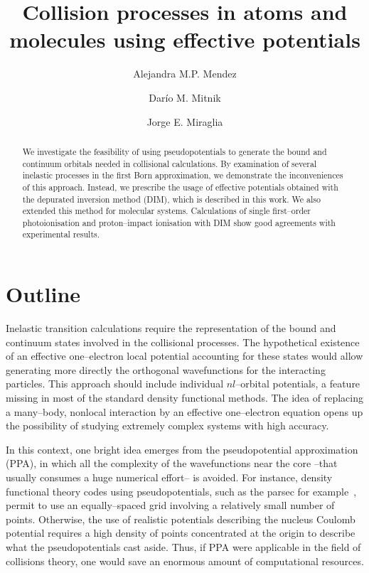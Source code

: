 \documentclass[10pt]{article}
\begin{document}
\title{Collision processes in atoms and molecules using effective 
potentials}
\author[ ]{Alejandra M.P. Mendez}
\author[ ]{Dar\'io M. Mitnik}
\author[ ]{Jorge E. Miraglia}

\maketitle

\tableofcontents

\begin{abstract}
We investigate the feasibility of using pseudopotentials to generate
the bound and continuum orbitals needed in collisional calculations. 
By examination of several inelastic processes in the first Born 
approximation, we demonstrate the inconveniences of this approach. 
Instead, we prescribe the usage of effective potentials obtained with 
the depurated inversion method (DIM), which is described in this work. 
We also extended this method for molecular systems. Calculations of 
single first--order photoionisation and proton--impact ionisation with 
DIM show good agreements with experimental results.
\end{abstract}


\section{Outline}

Inelastic transition calculations require the representation of 
the bound and continuum states involved in the collisional processes. 
The hypothetical existence of an effective one--electron local 
potential accounting for these states would allow generating more 
directly the orthogonal wavefunctions for the interacting particles.
This approach should include individual $nl$--orbital potentials, a 
feature missing in most of the standard density functional methods. 
The idea of replacing a many--body, nonlocal interaction by an 
effective one--electron equation opens up the possibility of studying
extremely complex systems with high accuracy. 

In this context, one bright idea emerges from the pseudopotential
approximation (PPA), in which all the complexity of the wavefunctions near 
the core --that usually consumes a huge numerical effort-- is avoided.
For instance, density functional theory codes using pseudopotentials, 
such as the {\sc parsec} for example~\cite{parsecwebpage,Chelikowsky1994}, 
permit to use an equally--spaced grid involving a relatively small 
number of points. 
Otherwise, the use of realistic potentials describing the nucleus 
Coulomb potential requires a high density of points concentrated at the 
origin to describe what the pseudopotentials cast aside. 
Thus, if PPA were applicable in the field of collisions theory, 
one would save an enormous amount of computational resources.
\end{document}

